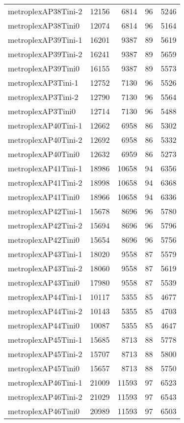\begin{longtable}{lrrrr}
metroplexAP38Tini-2 & 12156 & 6814 & 96 & 5246 \\
metroplexAP38Tini0 & 12074 & 6814 & 96 & 5164 \\
metroplexAP39Tini-1 & 16201 & 9387 & 89 & 5619 \\
metroplexAP39Tini-2 & 16241 & 9387 & 89 & 5659 \\
metroplexAP39Tini0 & 16155 & 9387 & 89 & 5573 \\
metroplexAP3Tini-1 & 12752 & 7130 & 96 & 5526 \\
metroplexAP3Tini-2 & 12790 & 7130 & 96 & 5564 \\
metroplexAP3Tini0 & 12714 & 7130 & 96 & 5488 \\
metroplexAP40Tini-1 & 12662 & 6958 & 86 & 5302 \\
metroplexAP40Tini-2 & 12692 & 6958 & 86 & 5332 \\
metroplexAP40Tini0 & 12632 & 6959 & 86 & 5273 \\
metroplexAP41Tini-1 & 18986 & 10658 & 94 & 6356 \\
metroplexAP41Tini-2 & 18998 & 10658 & 94 & 6368 \\
metroplexAP41Tini0 & 18966 & 10658 & 94 & 6336 \\
metroplexAP42Tini-1 & 15678 & 8696 & 96 & 5780 \\
metroplexAP42Tini-2 & 15694 & 8696 & 96 & 5796 \\
metroplexAP42Tini0 & 15654 & 8696 & 96 & 5756 \\
metroplexAP43Tini-1 & 18020 & 9558 & 87 & 5579 \\
metroplexAP43Tini-2 & 18060 & 9558 & 87 & 5619 \\
metroplexAP43Tini0 & 17980 & 9558 & 87 & 5539 \\
metroplexAP44Tini-1 & 10117 & 5355 & 85 & 4677 \\
metroplexAP44Tini-2 & 10143 & 5355 & 85 & 4703 \\
metroplexAP44Tini0 & 10087 & 5355 & 85 & 4647 \\
metroplexAP45Tini-1 & 15685 & 8713 & 88 & 5778 \\
metroplexAP45Tini-2 & 15707 & 8713 & 88 & 5800 \\
metroplexAP45Tini0 & 15657 & 8713 & 88 & 5750 \\
metroplexAP46Tini-1 & 21009 & 11593 & 97 & 6523 \\
metroplexAP46Tini-2 & 21029 & 11593 & 97 & 6543 \\
metroplexAP46Tini0 & 20989 & 11593 & 97 & 6503 \\

\end{longtable}
